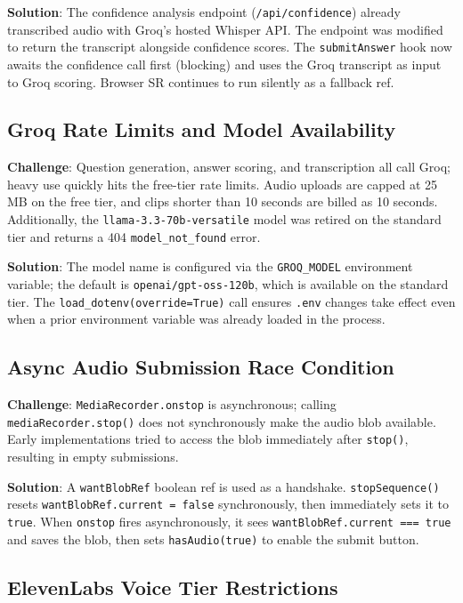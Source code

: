 \documentclass[12pt,a4paper]{article}
\begin{document}
\textbf{Solution}: The confidence analysis endpoint (\texttt{/api/confidence}) already transcribed audio with Groq's hosted Whisper API. The endpoint was modified to return the transcript alongside confidence scores. The \texttt{submitAnswer} hook now awaits the confidence call first (blocking) and uses the Groq transcript as input to Groq scoring. Browser SR continues to run silently as a fallback ref.

\subsection{Groq Rate Limits and Model Availability}

\textbf{Challenge}: Question generation, answer scoring, and transcription all call Groq; heavy use quickly hits the free-tier rate limits. Audio uploads are capped at 25\,MB on the free tier, and clips shorter than 10 seconds are billed as 10 seconds. Additionally, the \texttt{llama-3.3-70b-versatile} model was retired on the standard tier and returns a 404 \texttt{model\_not\_found} error.

\textbf{Solution}: The model name is configured via the \texttt{GROQ\_MODEL} environment variable; the default is \texttt{openai/gpt-oss-120b}, which is available on the standard tier. The \texttt{load\_dotenv(override=True)} call ensures \texttt{.env} changes take effect even when a prior environment variable was already loaded in the process.

\subsection{Async Audio Submission Race Condition}

\textbf{Challenge}: \texttt{MediaRecorder.onstop} is asynchronous; calling \texttt{mediaRecorder.stop()} does not synchronously make the audio blob available. Early implementations tried to access the blob immediately after \texttt{stop()}, resulting in empty submissions.

\textbf{Solution}: A \texttt{wantBlobRef} boolean ref is used as a handshake. \texttt{stopSequence()} resets \texttt{wantBlobRef.current = false} synchronously, then immediately sets it to \texttt{true}. When \texttt{onstop} fires asynchronously, it sees \texttt{wantBlobRef.current === true} and saves the blob, then sets \texttt{hasAudio(true)} to enable the submit button.

\subsection{ElevenLabs Voice Tier Restrictions}
\end{document}
